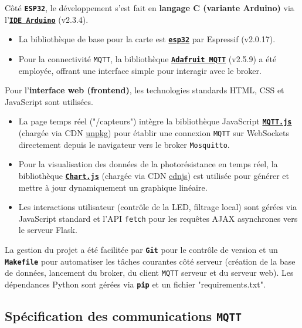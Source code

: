 \documentclass[12pt]{article}
\begin{document}
Côté \textbf{\texttt{ESP32}}, le développement s'est fait en \textbf{langage C (variante Arduino)} via l'\textbf{\href{https://www.arduino.cc/}{\texttt{IDE Arduino}}} (v2.3.4).
\begin{itemize}
    \item La bibliothèque de base pour la carte est \textbf{\href{https://github.com/espressif/arduino-esp32}{\texttt{esp32}}} par Espressif (v2.0.17).
    \item Pour la connectivité \texttt{MQTT}, la bibliothèque \textbf{\href{https://docs.arduino.cc/libraries/adafruit-mqtt-library/}{\texttt{Adafruit MQTT}}} (v2.5.9) a été employée, offrant une interface simple pour interagir avec le broker.
\end{itemize}

Pour l'\textbf{interface web (frontend)}, les technologies standards HTML, CSS et JavaScript sont utilisées.
\begin{itemize}
    \item La page temps réel ("/capteurs") intègre la bibliothèque JavaScript \textbf{\href{https://github.com/mqttjs/MQTT.js/}{\texttt{MQTT.js}}} (chargée via CDN \href{https://unpkg.com/}{unpkg}) pour établir une connexion \texttt{MQTT} sur WebSockets directement depuis le navigateur vers le broker \texttt{Mosquitto}.
    \item Pour la visualisation des données de la photorésistance en temps réel, la bibliothèque \textbf{\href{https://www.chartjs.org/}{\texttt{Chart.js}}} (chargée via CDN \href{https://cdnjs.com/}{cdnjs}) est utilisée pour générer et mettre à jour dynamiquement un graphique linéaire.
    \item Les interactions utilisateur (contrôle de la LED, filtrage local) sont gérées via JavaScript standard et l'API \texttt{fetch} pour les requêtes AJAX asynchrones vers le serveur Flask.
\end{itemize}

La gestion du projet a été facilitée par \textbf{\texttt{Git}} pour le contrôle de version et un \textbf{\texttt{Makefile}} pour automatiser les tâches courantes côté serveur (création de la base de données, lancement du broker, du client \texttt{MQTT} serveur et du serveur web). Les dépendances Python sont gérées via \textbf{\texttt{pip}} et un fichier "requirements.txt".

\subsection{Spécification des communications \texttt{MQTT}}
\end{document}
